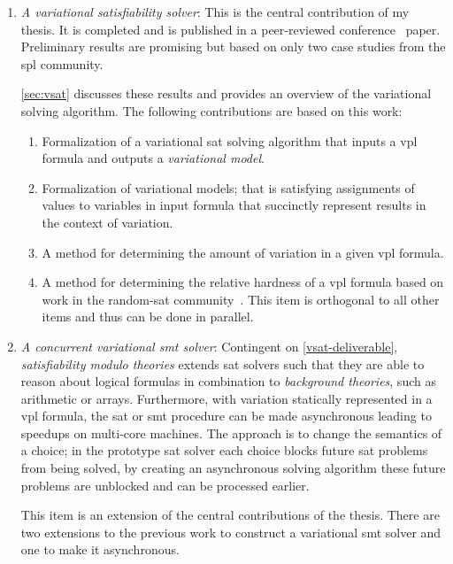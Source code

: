 \begin{enumerate}
\item\label{vsat-deliverable} \emph{A variational satisfiability solver}: This
  is the central contribution of my thesis. It is completed and is published in
  a peer-reviewed conference~\cite{10.1145/3382025.3414965} paper. Preliminary
  results are promising but based on only two case studies from the \ac{spl}
  community.

  \autoref{sec:vsat} discusses these results and provides an overview of the
  variational solving algorithm. The following contributions are based on this
  work:
  \begin{enumerate}
  \item \checkmark{} Formalization of a variational \ac{sat} solving algorithm
    that inputs a \ac{vpl} formula and outputs a \emph{variational model}.
  \item \checkmark{} Formalization of variational models; that is satisfying
    assignments of values to variables in input formula that succinctly
    represent results in the context of variation.
  \item \checkmark{} A method for determining the amount of variation in a given
    \ac{vpl} formula.
  \item\label{phase-change-deliverable} A method for determining the relative
    hardness of a \ac{vpl} formula based on work in the random-\ac{sat}
    community~\cite{Gent94thesat}. This item is orthogonal to all other items
    and thus can be done in parallel.
  \end{enumerate}

\item\label{vsmt-deliverable} \emph{A concurrent variational \ac{smt} solver}:
  Contingent on \autoref{vsat-deliverable}, \emph{satisfiability modulo
    theories} extends \ac{sat} solvers such that they are able to reason about
  logical formulas in combination to \textit{background theories}, such as
  arithmetic or arrays. Furthermore, with variation statically represented in a
  \ac{vpl} formula, the \ac{sat} or \ac{smt} procedure can be made asynchronous
  leading to speedups on multi-core machines. The approach is to change the
  semantics of a choice; in the prototype \ac{sat} solver each choice blocks
  future \ac{sat} problems from being solved, by creating an asynchronous
  solving algorithm these future problems are unblocked and can be processed
  earlier.

  This item is an extension of the central contributions of the thesis. There
  are two extensions to the previous work to construct a variational \ac{smt}
  solver and one to make it asynchronous.


\end{enumerate}

